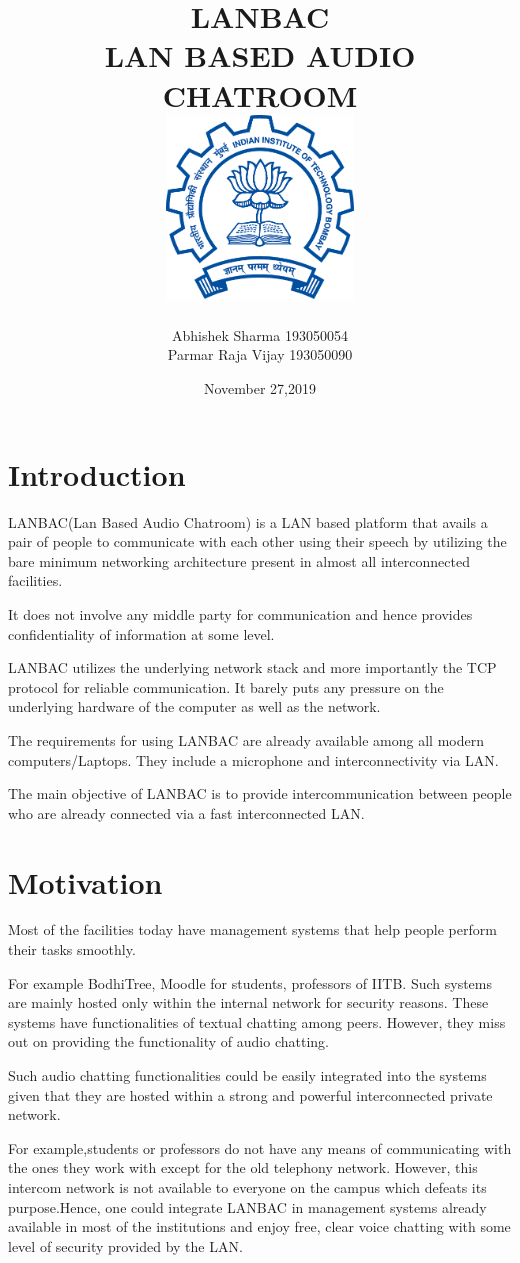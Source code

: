 \documentclass[12pt]{article}
\title{
    {\Huge LANBAC}\\
    {\Large LAN BASED AUDIO CHATROOM}\\
    \vspace{+35pt}
    {\includegraphics[width=50mm,scale=0.5]{iitb.png}}
}
\author{
    \large Abhishek Sharma 193050054\\
    \large Parmar Raja Vijay 193050090
}
\date{November 27,2019}
\begin{document}
\maketitle
\newpage
\tableofcontents
\newpage
\section{Introduction}

LANBAC(Lan Based Audio Chatroom) is a LAN based platform that avails a pair of people to communicate with each other using their speech by utilizing the bare minimum networking architecture present in almost all interconnected facilities.


It does not involve any middle party for communication and hence provides confidentiality of information at some level.


LANBAC utilizes the underlying network stack and more importantly the TCP protocol for reliable communication. It barely puts any pressure on the underlying hardware of the computer as well as the network.


The requirements for using LANBAC are already available among all modern computers/Laptops. They include a microphone and interconnectivity via LAN.


The main objective of LANBAC is to provide intercommunication between people who are already connected via a fast interconnected LAN.

\section{Motivation}
Most of the facilities today have management systems that help people perform their tasks smoothly.

For example BodhiTree, Moodle for students, professors of IITB. Such systems are mainly hosted only within the internal network for security reasons. These systems have functionalities of textual chatting among peers. However, they miss out on providing the functionality of audio chatting.

Such audio chatting functionalities could be easily integrated into the systems given that they are hosted within a strong and powerful interconnected private network.


For example,students or professors do not have any means of communicating with the ones they work with except for the old telephony network. However, this intercom network is not available to everyone on the campus which defeats its purpose.Hence, one could integrate LANBAC in management systems already available in most of the institutions and enjoy free, clear voice chatting with some level of security provided by the LAN.
\end{document}
